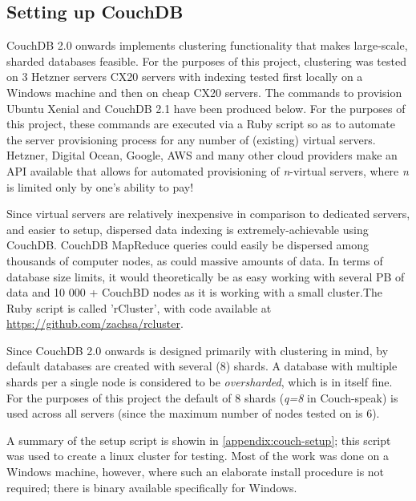 \subsection{Setting up CouchDB}
CouchDB 2.0 onwards implements clustering functionality that makes large-scale, sharded databases feasible. For the purposes of this project, clustering was tested on 3 Hetzner servers CX20 servers with indexing tested first locally on a Windows machine and then on cheap CX20 servers. The commands to provision Ubuntu Xenial and CouchDB 2.1 have been produced below. For the purposes of this project, these commands are executed via a Ruby script so as to automate the server provisioning process for any number of (existing) virtual servers. Hetzner, Digital Ocean, Google, AWS and many other cloud providers make an API available that allows for automated provisioning of \textit{n}-virtual servers, where \textit{n} is limited only by one's ability to pay!

Since virtual servers are relatively inexpensive in comparison to dedicated servers, and easier to setup, dispersed data indexing is extremely-achievable using CouchDB. CouchDB MapReduce queries could easily be dispersed among thousands of computer nodes, as could massive amounts of data. In terms of database size limits, it would theoretically be as easy working with several PB of data and 10 000 + CouchBD nodes as it is working with a small cluster.The Ruby script is called 'rCluster', with code available at \url{https://github.com/zachsa/rcluster}.

Since CouchDB 2.0 onwards is designed primarily with clustering in mind, by default databases are created with several (8) shards. A database with multiple shards per a single node is considered to be \textit{oversharded}, which is in itself fine. For the purposes of this project the default of 8 shards (\textit{q=8} in Couch-speak) is used across all servers (since the maximum number of nodes tested on is 6).

A summary of the setup script is showin in \ref{appendix:couch-setup}; this script was used to create a linux cluster for testing. Most of the work was done on a Windows machine, however, where such an elaborate install procedure is not required; there is binary available specifically for Windows.